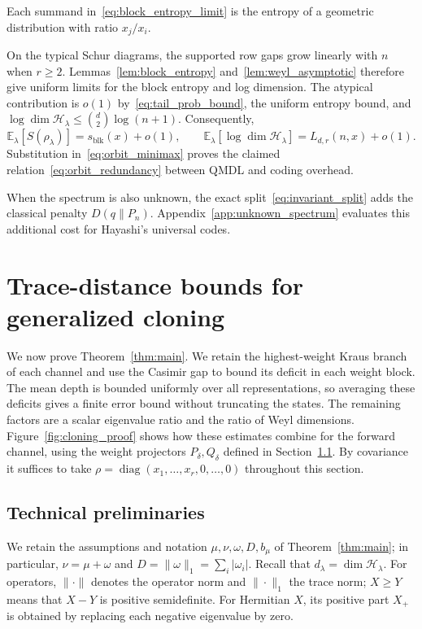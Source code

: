 \documentclass[a4paper,onecolumn,11pt]{quantumarticle}
\def\h{\mathcal{H}}
\begin{document}
Each summand in~\eqref{eq:block_entropy_limit} is the entropy of a
geometric distribution with ratio $x_j/x_i$.

On the typical Schur diagrams, the supported row gaps grow linearly
with $n$ when $r\ge2$. Lemmas~\ref{lem:block_entropy}
and~\ref{lem:weyl_asymptotic} therefore give uniform limits for
the block entropy and log dimension. The atypical contribution
is $o(1)$ by~\eqref{eq:tail_prob_bound}, the uniform entropy bound,
and $\log\dim\h_\lambda\le\binom d2\log(n+1)$. Consequently,
\[
\mathbb E_\lambda[S(\rho_\lambda)]=s_{\mathrm{blk}}(x)+o(1),
\qquad
\mathbb E_\lambda[\log\dim\h_\lambda]=L_{d,r}(n,x)+o(1).
\]
Substitution in~\eqref{eq:orbit_minimax} proves the claimed
relation~\eqref{eq:orbit_redundancy} between QMDL and
coding overhead.

When the spectrum is also unknown, the exact
split~\eqref{eq:invariant_split} adds the classical penalty
$D(q\|P_n)$. Appendix~\ref{app:unknown_spectrum} evaluates this
additional cost for Hayashi's universal codes.

\section{Trace-distance bounds for generalized cloning}\label{sec:fidelity}

We now prove Theorem~\ref{thm:main}. We retain the highest-weight Kraus
branch of each channel and use the Casimir gap to bound its deficit
in each weight block. The mean depth is bounded uniformly over all
representations, so averaging these deficits gives a finite error
bound without truncating the states. The remaining factors are a
scalar eigenvalue ratio and the ratio of Weyl dimensions.
Figure~\ref{fig:cloning_proof} shows how these estimates combine
for the forward channel, using the weight projectors $P_\delta,Q_\delta$
defined in Section~\ref{sec:prelim}.
By covariance it suffices to take $\rho=\operatorname{diag}
(x_1,\ldots,x_r,0,\ldots,0)$ throughout this section.



\subsection{Technical preliminaries}\label{sec:prelim}

We retain the assumptions and notation $\mu,\nu,\omega,D,b_\mu$ of
Theorem~\ref{thm:main}; in particular, $\nu=\mu+\omega$ and
$D=\|\omega\|_1=\sum_i|\omega_i|$. Recall that
$d_\lambda=\dim\mathcal H_\lambda$. For operators, $\|\cdot\|$ denotes
the operator norm and $\|\cdot\|_1$ the trace norm;
$X\ge Y$ means that $X-Y$ is positive semidefinite. For Hermitian
$X$, its positive part $X_+$ is obtained by replacing each negative
eigenvalue by zero.
\end{document}
